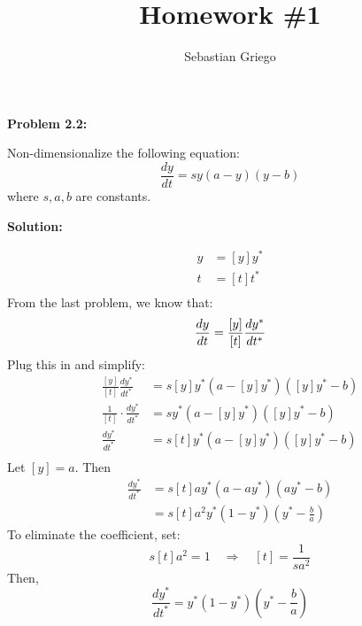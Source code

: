 \documentclass[12pt]{article}
\newenvironment{problem}[1]{
\textbf{Problem #1:}
}{
\rmfamily \vspace{1em}
}
\newenvironment{solution}{
\textbf{Solution:}

}{

\vspace{2em}
}
\begin{document}
\title{Homework \#1}  %
\author{Sebastian Griego}  %

\begin{problem}{2.2}
    Non-dimensionalize the following equation:
    \[
        \frac{dy}{dt} = sy(a-y)(y-b)
    \]
    where \(s, a, b\) are constants.
\end{problem}

\begin{solution}
    \[
        \begin{aligned}
            y &= [y]y^* \\
            t &= [t]t^* \\
        \end{aligned}
    \]
    From the last problem, we know that:
    \[
        \frac{dy}{dt} = \frac{[y]}{[t]} \frac{dy^*}{dt^*} \\
    \]
    Plug this in and simplify:
    \[
        \begin{aligned}
            \frac{[y]}{[t]} \frac{dy^*}{dt^*} &= s[y]y^*(a-[y]y^*)([y]y^*-b) \\
            \frac{1}{[t]} \cdot \frac{dy^*}{dt^*} &= s y^*(a-[y]y^*)([y]y^*-b) \\
            \frac{dy^*}{dt^*} &= s [t] y^* (a-[y]y^*)([y]y^*-b) \\
        \end{aligned}
    \]
    Let \([y] = a\). Then
    \[
    \begin{aligned}
        \frac{dy^*}{dt^*} &= s [t] a y^* (a - a y^*)(a y^* - b) \\
        &= s [t] a^2 y^* (1 - y^*)(y^* - \frac{b}{a})
    \end{aligned}
    \]
    To eliminate the coefficient, set:
    \[
        s [t] a^2 = 1 \quad \Rightarrow \quad [t] = \frac{1}{s a^2}
    \]
    Then,
    \[
        \frac{dy^*}{dt^*} = y^* (1 - y^*) \left( y^* - \frac{b}{a} \right)
    \]


\end{solution}
\end{document}
